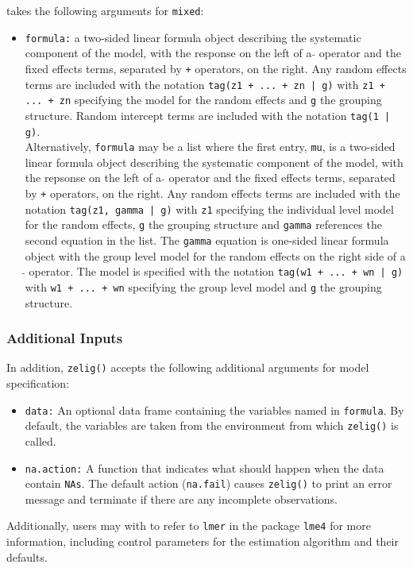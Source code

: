  takes the following arguments for {\tt mixed}:
\begin{itemize}
\item {\tt formula:} a two-sided linear formula object describing the systematic component of the model, with the response on the left of a {\tt $\tilde{}$} operator and the fixed effects terms, separated by {\tt +} operators, on the right. Any random effects terms are included with the notation {\tt tag(z1 + ... + zn | g)} with {\tt z1 + ... + zn} specifying the model for the random effects and {\tt g} the grouping structure. Random intercept terms are included with the notation {\tt tag(1 | g)}. \\
Alternatively, {\tt formula} may be a list where the first entry, {\tt mu}, is a two-sided linear formula object describing the systematic component of the model, with the repsonse on the left of a {\tt $\tilde{}$} operator and the fixed effects terms, separated by {\tt +} operators, on the right. Any random effects terms are included with the notation {\tt tag(z1, gamma | g)} with {\tt z1} specifying the individual level model for the random effects, {\tt g} the grouping structure and {\tt gamma} references the second equation in the list. The {\tt gamma} equation is one-sided linear formula object with the group level model for the random effects on the right side of a {\tt $\tilde{}$} operator. The model is specified with the notation {\tt tag(w1 + ... + wn | g)} with {\tt w1 + ... + wn} specifying the group level model and {\tt g} the grouping structure.
\end{itemize}

\subsubsection{Additional Inputs}

In addition, {\tt zelig()} accepts the following additional arguments for model specification:

\begin{itemize}
\item {\tt data:} An optional data frame containing the variables named in {\tt formula}. By default, the variables are taken from the environment from which {\tt zelig()} is called.
\item {\tt na.action:} A function that indicates what should happen when the data contain {\tt NAs}. The default action ({\tt na.fail}) causes {\tt zelig()} to print an error message and terminate if there are any incomplete observations.
\end{itemize}
Additionally, users may with to refer to {\tt lmer} in the package {\tt lme4} for more information, including control parameters for the estimation algorithm and their defaults.

